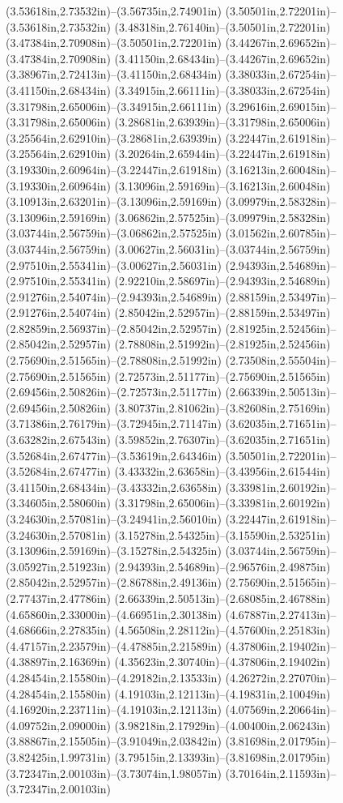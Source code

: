 (3.53618in,2.73532in)--(3.56735in,2.74901in) (3.50501in,2.72201in)--(3.53618in,2.73532in) (3.48318in,2.76140in)--(3.50501in,2.72201in) (3.47384in,2.70908in)--(3.50501in,2.72201in) (3.44267in,2.69652in)--(3.47384in,2.70908in) (3.41150in,2.68434in)--(3.44267in,2.69652in) (3.38967in,2.72413in)--(3.41150in,2.68434in) (3.38033in,2.67254in)--(3.41150in,2.68434in) (3.34915in,2.66111in)--(3.38033in,2.67254in) (3.31798in,2.65006in)--(3.34915in,2.66111in) (3.29616in,2.69015in)--(3.31798in,2.65006in) (3.28681in,2.63939in)--(3.31798in,2.65006in) (3.25564in,2.62910in)--(3.28681in,2.63939in) (3.22447in,2.61918in)--(3.25564in,2.62910in) (3.20264in,2.65944in)--(3.22447in,2.61918in) (3.19330in,2.60964in)--(3.22447in,2.61918in) (3.16213in,2.60048in)--(3.19330in,2.60964in) (3.13096in,2.59169in)--(3.16213in,2.60048in) (3.10913in,2.63201in)--(3.13096in,2.59169in) (3.09979in,2.58328in)--(3.13096in,2.59169in) (3.06862in,2.57525in)--(3.09979in,2.58328in) (3.03744in,2.56759in)--(3.06862in,2.57525in) (3.01562in,2.60785in)--(3.03744in,2.56759in) (3.00627in,2.56031in)--(3.03744in,2.56759in) (2.97510in,2.55341in)--(3.00627in,2.56031in) (2.94393in,2.54689in)--(2.97510in,2.55341in) (2.92210in,2.58697in)--(2.94393in,2.54689in) (2.91276in,2.54074in)--(2.94393in,2.54689in) (2.88159in,2.53497in)--(2.91276in,2.54074in) (2.85042in,2.52957in)--(2.88159in,2.53497in) (2.82859in,2.56937in)--(2.85042in,2.52957in) (2.81925in,2.52456in)--(2.85042in,2.52957in) (2.78808in,2.51992in)--(2.81925in,2.52456in) (2.75690in,2.51565in)--(2.78808in,2.51992in) (2.73508in,2.55504in)--(2.75690in,2.51565in) (2.72573in,2.51177in)--(2.75690in,2.51565in) (2.69456in,2.50826in)--(2.72573in,2.51177in) (2.66339in,2.50513in)--(2.69456in,2.50826in) (3.80737in,2.81062in)--(3.82608in,2.75169in) (3.71386in,2.76179in)--(3.72945in,2.71147in) (3.62035in,2.71651in)--(3.63282in,2.67543in) (3.59852in,2.76307in)--(3.62035in,2.71651in) (3.52684in,2.67477in)--(3.53619in,2.64346in) (3.50501in,2.72201in)--(3.52684in,2.67477in) (3.43332in,2.63658in)--(3.43956in,2.61544in) (3.41150in,2.68434in)--(3.43332in,2.63658in) (3.33981in,2.60192in)--(3.34605in,2.58060in) (3.31798in,2.65006in)--(3.33981in,2.60192in) (3.24630in,2.57081in)--(3.24941in,2.56010in) (3.22447in,2.61918in)--(3.24630in,2.57081in) (3.15278in,2.54325in)--(3.15590in,2.53251in) (3.13096in,2.59169in)--(3.15278in,2.54325in) (3.03744in,2.56759in)--(3.05927in,2.51923in) (2.94393in,2.54689in)--(2.96576in,2.49875in) (2.85042in,2.52957in)--(2.86788in,2.49136in) (2.75690in,2.51565in)--(2.77437in,2.47786in) (2.66339in,2.50513in)--(2.68085in,2.46788in) (4.65860in,2.33000in)--(4.66951in,2.30138in) (4.67887in,2.27413in)--(4.68666in,2.27835in) (4.56508in,2.28112in)--(4.57600in,2.25183in) (4.47157in,2.23579in)--(4.47885in,2.21589in) (4.37806in,2.19402in)--(4.38897in,2.16369in) (4.35623in,2.30740in)--(4.37806in,2.19402in) (4.28454in,2.15580in)--(4.29182in,2.13533in) (4.26272in,2.27070in)--(4.28454in,2.15580in) (4.19103in,2.12113in)--(4.19831in,2.10049in) (4.16920in,2.23711in)--(4.19103in,2.12113in) (4.07569in,2.20664in)--(4.09752in,2.09000in) (3.98218in,2.17929in)--(4.00400in,2.06243in) (3.88867in,2.15505in)--(3.91049in,2.03842in) (3.81698in,2.01795in)--(3.82425in,1.99731in) (3.79515in,2.13393in)--(3.81698in,2.01795in) (3.72347in,2.00103in)--(3.73074in,1.98057in) (3.70164in,2.11593in)--(3.72347in,2.00103in) 